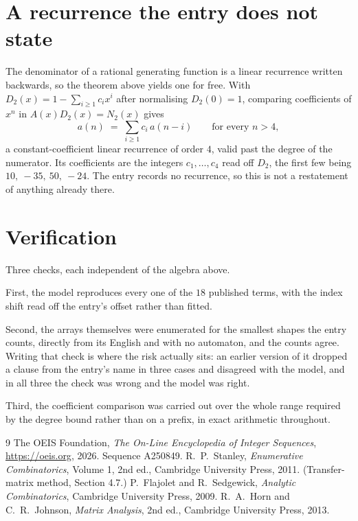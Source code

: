 \documentclass[11pt,a4paper]{article}
\theoremstyle{plain}
\theoremstyle{definition}
\begin{document}
\section{A recurrence the entry does not state}

The denominator of a rational generating function is a linear recurrence written backwards, so
the theorem above yields one for free. With $D_2(x)=1-\sum_{i\ge1}c_ix^i$ after normalising
$D_2(0)=1$, comparing coefficients of $x^n$ in $A(x)D_2(x)=N_2(x)$ gives
\[
a(n)\;=\;\sum_{i\ge1}c_i\,a(n-i)\qquad\text{for every }n>4,
\]
a constant-coefficient linear recurrence of order $4$, valid past the degree of the
numerator. Its coefficients are the integers $c_1,\dots,c_{4}$ read off $D_2$, the first few being $10,\ -35,\ 50,\ -24$. The entry records no recurrence, so this is not a restatement of anything
already there.

\section{Verification}

Three checks, each independent of the algebra above.

First, the model reproduces every one of the $18$ published terms, with the index shift
read off the entry's offset rather than fitted.

Second, the arrays themselves were enumerated for the smallest shapes the entry counts,
directly from its English and with no automaton, and the counts agree. Writing that check is
where the risk actually sits: an earlier version of it dropped a clause from the entry's name
in three cases and disagreed with the model, and in all three the check was wrong and the model
was right.

Third, the coefficient comparison was carried out over the whole range required by the degree
bound rather than on a prefix, in exact arithmetic throughout.

\begin{thebibliography}{9}
 The OEIS Foundation, \emph{The On-Line Encyclopedia of Integer
Sequences}, \url{https://oeis.org}, 2026. Sequence A250849.
 R.~P.~Stanley, \emph{Enumerative Combinatorics}, Volume 1, 2nd ed.,
Cambridge University Press, 2011. (Transfer-matrix method, Section 4.7.)
 P.~Flajolet and R.~Sedgewick, \emph{Analytic Combinatorics}, Cambridge
University Press, 2009.
 R.~A.~Horn and C.~R.~Johnson, \emph{Matrix Analysis}, 2nd ed., Cambridge
University Press, 2013.
\end{thebibliography}
\end{document}
